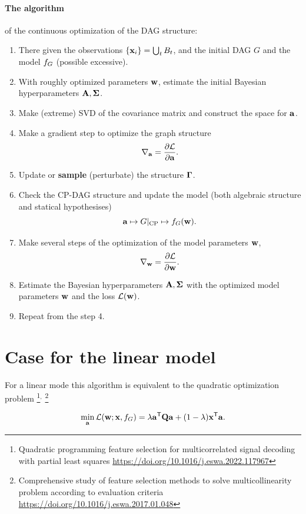 \documentclass[12pt]{article}
\begin{document}
\paragraph{The algorithm} of the continuous optimization of the DAG structure:
\begin{enumerate}
    \item There given the observations $\{\mathbf{x}_i\}=\bigcup_{t}B_t$, and the initial DAG $G$ and the model ${f_{G}}$
    (possible excessive).
    \item With roughly optimized parameters $\mathbf{w}$, estimate the initial Bayesian hyperparameters $\mathbf{A}, {\boldsymbol{\Sigma}}$.
    \item Make (extreme) SVD of the covariance matrix and construct the space for $\mathbf{a}$.
    \item Make a gradient step to optimize the graph structure
    \[
        \nabla_{\mathbf{a}} = \frac{\partial \mathcal{L}}{\partial \mathbf{a}}.
    \]
    \item Update or \textbf{sample} (perturbate) the structure ${\boldsymbol{\Gamma}}$.
    \item Check the CP-DAG structure and update the model (both algebraic structure and statical hypothesises)
    \[
        \mathbf{a} \mapsto G|_\text{CP} \mapsto {f_{G}}(\mathbf{w}).
    \]
    \item Make several steps of the optimization of the model parameters $\mathbf{w}$,
    \[
        \nabla_{\mathbf{w}} = \frac{\partial \mathcal{L}}{\partial \mathbf{w}}.
    \]
    \item Estimate the Bayesian hyperparameters $\mathbf{A}, {\boldsymbol{\Sigma}}$ with the optimized model parameters $\mathbf{w}$ and the loss $\mathcal{L}(\mathbf{w})$.
    \item Repeat from the step 4.
\end{enumerate}

\section{Case for the linear model}
For a linear mode this algorithm is equivalent to the quadratic optimization problem
\footnote{Quadratic programming feature selection for multicorrelated signal decoding with partial least squares
\url{https://doi.org/10.1016/j.eswa.2022.117967}}$^,$
\footnote{Comprehensive study of feature selection methods to solve multicollinearity problem according to evaluation criteria
\url{https://doi.org/10.1016/j.eswa.2017.01.048}}


\[
    \min_{\mathbf{a}}\mathcal{L}(\mathbf{w}; \mathbf{x}, {f_{G}}) = \lambda \mathbf{a}^{\mathsf{T}} \mathbf{Q} \mathbf{a} + (1-\lambda) \mathbf{x}^{\mathsf{T}} \mathbf{a}.
\]
\end{document}
